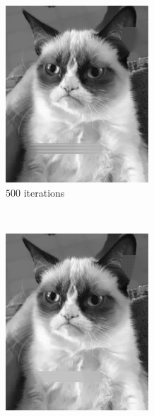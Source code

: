 \documentclass{paper}
\begin{document}
\begin{figure}[H]
\begin{subfigure}[ht]{0.3\textwidth}
	\includegraphics[width=\textwidth]{result-cat-lambda100-theta0_5-iter500}
	\caption*{$500$ iterations}
\end{subfigure}
~
\begin{subfigure}[ht]{0.3\textwidth}
	\centering
	\includegraphics[width=\textwidth]{result-cat-lambda100-theta0_5-iter1000}

\end{subfigure}
\end{figure}
\end{document}
